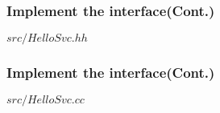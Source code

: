 \begin{frame}
    \frametitle{Implement the interface(Cont.)}
    \begin{block}{\(src/HelloSvc.hh\)}
    \par\usebox{\implinterfaceheader}
    \end{block}
\end{frame}
\begin{frame}
    \frametitle{Implement the interface(Cont.)}
    \begin{block}{\(src/HelloSvc.cc\)}
    \par\usebox{\implinterfaceimpl}
    \end{block}
\end{frame}
